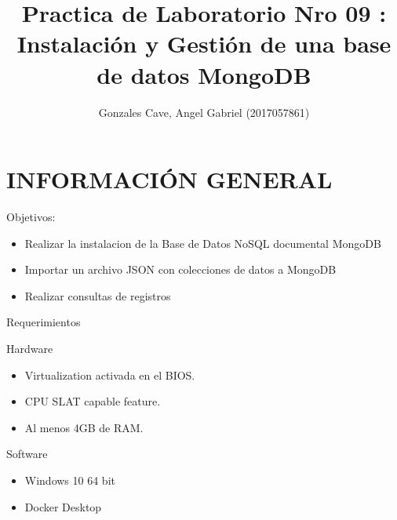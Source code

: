 \documentclass[preprint,12pt]{elsarticle}
\begin{document}
	\begin{frontmatter}
		\title{\huge Practica de Laboratorio Nro 09 : Instalación y Gestión de una base de datos MongoDB}
		\address{Universidad Privada de Tacna}
		\address{Escuela Profesional de Ingeniería de Sistemas}
		\address{Curso : Base de Datos II}		
		\author{Gonzales Cave, Angel Gabriel              	(2017057861)}		
		\address{Tacna, Perú}
\end{frontmatter}

\section{INFORMACIÓN GENERAL}
Objetivos:
\begin{itemize}
\item Realizar la instalacion de la Base de Datos NoSQL documental MongoDB
\item Importar un archivo JSON con colecciones de datos a MongoDB
\item Realizar consultas de registros
\end{itemize}

Requerimientos

Hardware
\begin{itemize}
\item Virtualization activada en el BIOS.
\item CPU SLAT capable feature.
\item Al menos 4GB de RAM.
\end{itemize}

Software
\begin{itemize}
\item Windows 10 64 bit
\item Docker Desktop
\end{itemize}

\end{document}
